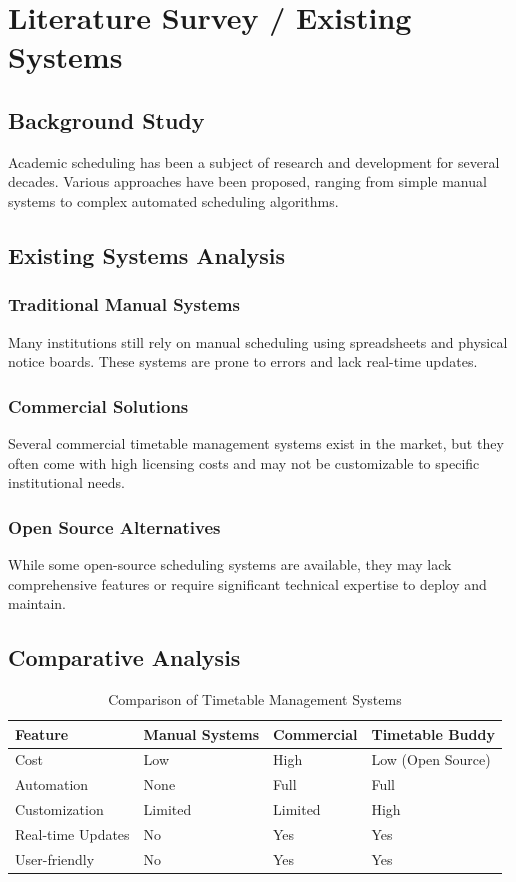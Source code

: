 \documentclass[12pt,a4paper]{report}
\begin{document}
\chapter{Literature Survey / Existing Systems}

\section{Background Study}
Academic scheduling has been a subject of research and development for several decades. Various approaches have been proposed, ranging from simple manual systems to complex automated scheduling algorithms.

\section{Existing Systems Analysis}
\subsection{Traditional Manual Systems}
Many institutions still rely on manual scheduling using spreadsheets and physical notice boards. These systems are prone to errors and lack real-time updates.

\subsection{Commercial Solutions}
Several commercial timetable management systems exist in the market, but they often come with high licensing costs and may not be customizable to specific institutional needs.

\subsection{Open Source Alternatives}
While some open-source scheduling systems are available, they may lack comprehensive features or require significant technical expertise to deploy and maintain.

\section{Comparative Analysis}
\begin{table}[h]
\centering
\begin{tabular}{|p{3cm}|p{3cm}|p{3cm}|p{3cm}|}
\hline
\textbf{Feature} & \textbf{Manual Systems} & \textbf{Commercial} & \textbf{Timetable Buddy} \\
\hline
Cost & Low & High & Low (Open Source) \\
\hline
Automation & None & Full & Full \\
\hline
Customization & Limited & Limited & High \\
\hline
Real-time Updates & No & Yes & Yes \\
\hline
User-friendly & No & Yes & Yes \\
\hline
\end{tabular}
\caption{Comparison of Timetable Management Systems}
\end{table}
\end{document}

